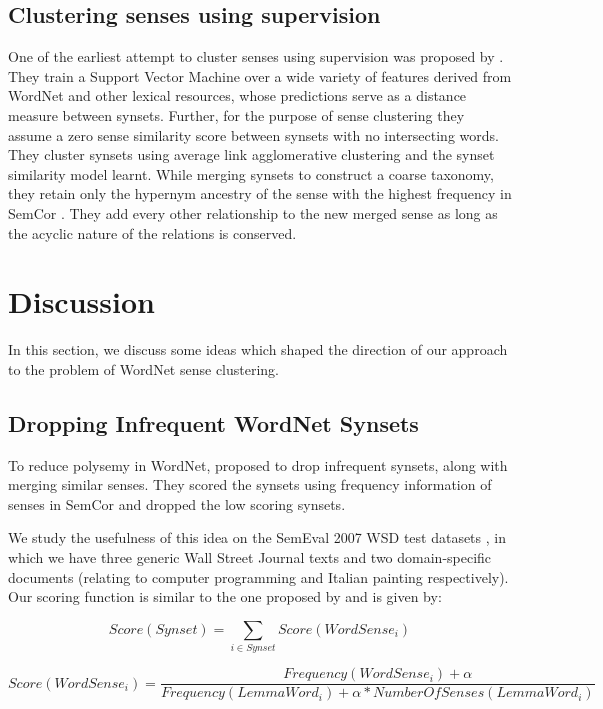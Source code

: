 \subsection{Clustering senses using supervision}
One of the earliest attempt to cluster senses using supervision was proposed by \citep{snow07mergesense}. They train a Support Vector Machine \citep{vapnikSVM:95} over a wide variety of features derived from WordNet and other lexical resources, whose predictions serve as a distance measure between synsets. Further, for the purpose of sense clustering they assume a zero sense similarity score between synsets with no intersecting words. They cluster synsets using average link agglomerative clustering and the synset similarity model learnt. While merging synsets to construct a coarse taxonomy, they retain only the hypernym ancestry of the sense with the highest frequency in SemCor \citep{SemCor}. They add every other relationship to the new merged sense as long as the acyclic nature of the relations is conserved.

\section{Discussion}
In this section, we discuss some ideas which shaped the direction of our approach to the problem of WordNet sense clustering.

\subsection{Dropping Infrequent WordNet Synsets}
To reduce polysemy in WordNet, \citep{Mihalcea01ez.wordnet:principles} proposed to drop infrequent synsets, along with merging similar senses. They scored the synsets using frequency information of senses in SemCor \citep{SemCor} and dropped the low scoring synsets. 

We study the usefulness of this idea on the SemEval 2007 WSD test datasets \citep{navigli-litkowski:SemEval-2007}, in which we have three generic Wall Street Journal texts and two domain-specific documents (relating to computer programming and Italian painting respectively). Our scoring function is similar to the one proposed by \citep{Mihalcea01ez.wordnet:principles} and is given by:

\begin{equation}
Score(Synset) = \sum_{i \in Synset} Score(WordSense_i) 
\end{equation}

\begin{equation}
Score(WordSense_i) = \frac{Frequency(WordSense_i)+\alpha}{Frequency(LemmaWord_i) + \alpha*NumberOfSenses(LemmaWord_i)} 
\end{equation}

